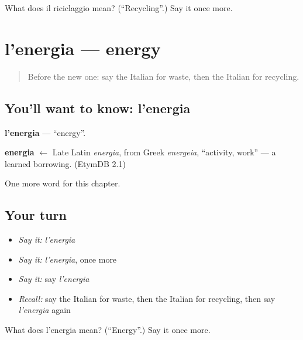 \begin{tcolorbox}[breakable,colback=teal!4,colframe=teal!35!black,title={Before you move on}]
What does il riciclaggio mean? (\textquotedblleft{}Recycling\textquotedblright{}.) Say it once more.
\end{tcolorbox}
\section[l'energia]{l'energia — energy}

\label{lesson:IT-C169-energia}



\begin{quote}
Before the new one: say the Italian for waste, then the Italian for recycling.
\end{quote}

\subsection*{You'll want to know: l'energia}
\textbf{l'energia} — \textquotedblleft{}energy\textquotedblright{}.

\begin{cousinweb}
\textbf{energia} $\leftarrow$ Late Latin \emph{energia}, from Greek \emph{energeia}, \textquotedblleft{}activity, work\textquotedblright{} — a learned borrowing. (EtymDB 2.1)
\end{cousinweb}

\begin{grammarlens}[title={What you've built}]
One more word for this chapter.
\end{grammarlens}

\subsection*{Your turn}
\begin{itemize}
\raggedright
  \item \emph{Say it:} \emph{l'energia}
  \item \emph{Say it:} \emph{l'energia}, once more
  \item \emph{Say it:} say \emph{l'energia}
  \item \emph{Recall:} say the Italian for waste, then the Italian for recycling, then say \emph{l'energia} again
\end{itemize}

\begin{tcolorbox}[breakable,colback=teal!4,colframe=teal!35!black,title={Before you move on}]
What does l'energia mean? (\textquotedblleft{}Energy\textquotedblright{}.) Say it once more.
\end{tcolorbox}

